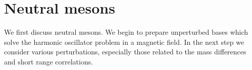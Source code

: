



\section{Neutral mesons}
\label{sec:neutral}

We first discuss neutral mesons. 
We begin to prepare unperturbed bases which solve the harmonic oscillator problem in a magnetic field. 
In the next step we consider various perturbations, especially those related to the mass differences and short range correlations.

